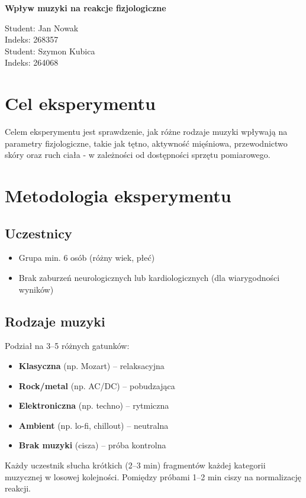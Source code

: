 \documentclass[a4paper,12pt]{article}
\begin{document}
	
	\begin{center}
		{\huge \bf Wpływ muzyki na reakcje fizjologiczne}
		\vspace{.3in}
		
		{\Large{Student: Jan Nowak}} \\
		{\large{Indeks: 268357}} \\
            {\Large{Student: Szymon Kubica}} \\
		{\large{Indeks: 264068}} \\
		
	\end{center}
	
	\section{Cel eksperymentu}
Celem eksperymentu jest sprawdzenie, jak różne rodzaje muzyki wpływają na parametry fizjologiczne, takie jak tętno, aktywność mięśniowa, przewodnictwo skóry oraz ruch ciała - w zależności od dostępności sprzętu pomiarowego.

\section{Metodologia eksperymentu}
\subsection{Uczestnicy}
\begin{itemize}
    \item Grupa min. 6 osób (różny wiek, płeć)
    \item Brak zaburzeń neurologicznych lub kardiologicznych (dla wiarygodności wyników)
   
\end{itemize}

\subsection{Rodzaje muzyki}
Podział na 3--5 różnych gatunków:
\begin{itemize}
    \item \textbf{Klasyczna} (np. Mozart) -- relaksacyjna
    \item \textbf{Rock/metal} (np. AC/DC) -- pobudzająca
    \item \textbf{Elektroniczna} (np. techno) -- rytmiczna
    \item \textbf{Ambient} (np. lo-fi, chillout) -- neutralna
    \item \textbf{Brak muzyki} (cisza) -- próba kontrolna 
\end{itemize}
Każdy uczestnik słucha krótkich (2--3 min) fragmentów każdej kategorii muzycznej w losowej kolejności. Pomiędzy próbami 1--2 min ciszy na normalizację reakcji.
\end{document}
